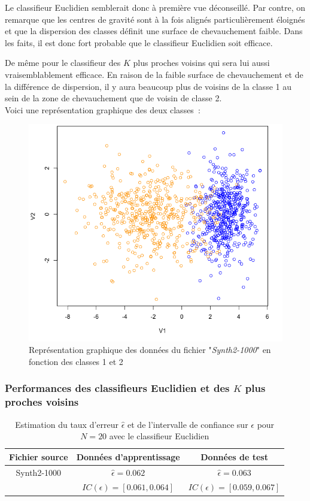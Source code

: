 \documentclass[a4paper,10pt]{report}
\begin{document}
Le classifieur Euclidien semblerait donc à première vue déconseillé. Par contre, on remarque que les centres de gravité sont à la fois alignés particulièrement éloignés et que la dispersion des classes définit une surface de chevauchement faible.
Dans les faits, il est donc fort probable que le classifieur Euclidien soit efficace.

De même pour le classifieur des $K$ plus proches voisins qui sera lui aussi vraisemblablement efficace. En raison de la faible surface de chevauchement et de la différence de dispersion, il y aura beaucoup plus de voisins de la classe 1 au 
sein de la zone de chevauchement que de voisin de classe 2.\\



Voici une représentation graphique des deux classes~:
\begin{figure}[H]
	\centering
	\captionsetup{justification=centering, margin=4cm}
	\includegraphics[width=.6\linewidth]{img/1-2-2-plot-Synth2-1000}
	\caption{\small Représentation graphique des données du fichier "\textit{Synth2-1000}" en fonction des classes 1 et 2}	
	\label{fig:1-2-2-plot-Synth2-1000}%
\end{figure}





\subsubsection{Performances des classifieurs Euclidien et des $K$ plus proches voisins}


\begin{table}[H]
	\centering
	\captionsetup{justification=centering, margin=4cm}
	\begin{tabular}{c|c|c}
		Fichier source & Données d'apprentissage & Données de test \\ 
		\hline
		\small Synth2-1000 & $ \hat{\epsilon} = 0.062 $  &  $ \hat{\epsilon} = 0.063 $ \\
		&  $ IC(\epsilon) = [ 0.061 , 0.064 ] $  & $ IC(\epsilon) = [ 0.059 , 0.067 ] $ \\ 
	\end{tabular}
	\caption{\small Estimation du taux d'erreur $\hat{\epsilon}$ et de l'intervalle de confiance sur $\epsilon$ pour $N = 20$ avec le classifieur Euclidien}
	\label{table:1-2-error-rate-Synth2-N-20-ceuc}
\end{table}
\end{document}
